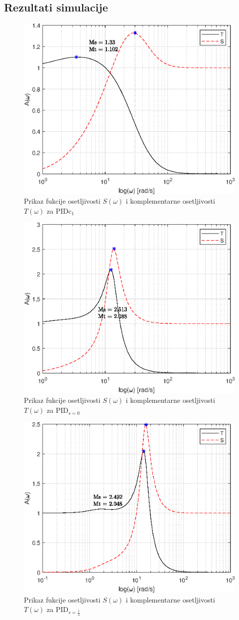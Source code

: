 \documentclass[a4paper,11pt]{article}
\theoremstyle{definition} \newtheorem{deff}{Definicija}[section]
\theoremstyle{definition} \newtheorem{prim}[deff]{Primer}
\theoremstyle{plain} \newtheorem{teor}[deff]{Teorema}
\begin{document}
	\clearpage
	\subsection{Rezultati simulacije} \label{sec:grafici}
	\begin{figure}[!h]
		\centering
		\includegraphics[width=0.46\linewidth]{slike/Ms_Mt_pidc.eps}
		\caption{Prikaz fukcije osetljivosti $S(\omega)$ i komplementarne osetljivosti $T(\omega)$ za PID$\text{c}_1$}
		\label{fig:MsMt_pidc}
	\end{figure}
	
	\begin{figure}[!h]
		\centering
		\includegraphics[width=0.46\linewidth]{slike/Ms_Mt_pid.eps}
		\caption{Prikaz fukcije osetljivosti $S(\omega)$ i komplementarne osetljivosti $T(\omega)$ za PID$_{s=0}$}
		\label{fig:MsMt_pid}
	\end{figure}
	
	\begin{figure}[!h]
		\centering
		\includegraphics[width=0.46\linewidth]{slike/Ms_Mt_pid_lam.eps}
		\caption{Prikaz fukcije osetljivosti $S(\omega)$ i komplementarne osetljivosti $T(\omega)$ za PID$_{s=\frac{1}{\lambda}}$}
		\label{fig:MsMt_pid_lam}
	\end{figure}
	
\end{document}
